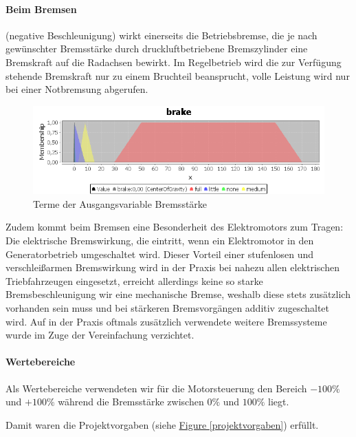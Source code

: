 \documentclass[10pt,a4paper]{article}
\begin{document}
\paragraph{Beim Bremsen} (negative Beschleunigung) wirkt einerseits die Betriebsbremse, die je nach gewünschter Bremsstärke durch druckluftbetriebene Bremszylinder eine Bremskraft auf die Radachsen bewirkt. Im Regelbetrieb wird die zur Verfügung stehende Bremskraft nur zu einem Bruchteil beansprucht, volle Leistung wird nur bei einer Notbremsung abgerufen.

\begin{figure}[htb]
\begin{center}
\includegraphics[width=\textwidth]{var_brake.png}
\caption[Ausgangsvariable Bremsstärke]{Terme der Ausgangsvariable Bremsstärke}
\label{var_brake}
\end{center}
\end{figure}

Zudem kommt beim Bremsen eine Besonderheit des Elektromotors zum Tragen: Die elektrische Bremswirkung, die eintritt, wenn ein Elektromotor in den Generatorbetrieb umgeschaltet wird. Dieser Vorteil einer stufenlosen und verschleißarmen Bremswirkung wird in der Praxis bei nahezu allen elektrischen Triebfahrzeugen eingesetzt, erreicht allerdings keine so starke Bremsbeschleunigung wir eine mechanische Bremse, weshalb diese stets zusätzlich vorhanden sein muss und bei stärkeren Bremsvorgängen additiv zugeschaltet wird.
Auf in der Praxis oftmals zusätzlich verwendete weitere Bremssysteme wurde im Zuge der Vereinfachung verzichtet.

\paragraph{Wertebereiche}
Als Wertebereiche verwendeten wir für die Motorsteuerung den Bereich $ -100 \% $ und $ +100 \% $ während die Bremsstärke zwischen $ 0 \% $ und $ 100 \% $ liegt.

Damit waren die Projektvorgaben (siehe \hyperref[projektvorgaben]{Figure \ref*{projektvorgaben}}) erfüllt.
\end{document}
